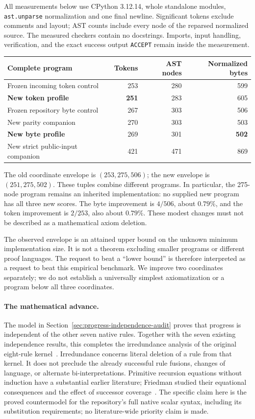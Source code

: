 \documentclass[11pt,letterpaper]{article}
\theoremstyle{definition}
\begin{document}
All measurements below use CPython 3.12.14, whole standalone modules,
\texttt{ast.unparse} normalization and one final newline. Significant tokens
exclude comments and layout; AST counts include every node of the reparsed
normalized source. The measured checkers contain no docstrings. Imports,
input handling, verification, and the exact success output \texttt{ACCEPT}
remain inside the measurement.

\begin{center}\small
\begin{tabular}{lrrr}
\toprule
Complete program & Tokens & AST nodes & Normalized bytes\\
\midrule
Frozen incoming token control & 253 & 280 & 599\\
\textbf{New token profile} & \textbf{251} & 283 & 605\\
Frozen repository byte control & 267 & 303 & 506\\
New parity companion & 270 & 303 & 503\\
\textbf{New byte profile} & 269 & 301 & \textbf{502}\\
New strict public-input companion & 421 & 471 & 869\\
\bottomrule
\end{tabular}
\end{center}

The old coordinate envelope is $(253,275,506)$; the new envelope is
$(251,275,502)$. These tuples combine different programs. In particular,
the 275-node program remains an inherited implementation: no supplied new
program has all three new scores. The byte improvement is $4/506$, about
$0.79\%$, and the token improvement is $2/253$, also about $0.79\%$.
These modest changes must not be described as a mathematical axiom deletion.

The observed envelope is an attained upper bound on the unknown minimum
implementation size. It is not a theorem excluding smaller programs or
different proof languages. The request to beat a ``lower bound'' is therefore
interpreted as a request to beat this empirical benchmark. We improve two
coordinates separately; we do not establish a universally simplest
axiomatization or a program below all three coordinates.

\paragraph{The mathematical advance.}
The model in Section~\ref{sec:progress-independence-audit} proves that
progress is independent of the other seven native rules. Together with the
seven existing independence results, this completes the irredundance
analysis of the original eight-rule kernel~\cite{models}. Irredundance
concerns literal deletion of a rule from that kernel. It does not preclude
the already successful rule fusions, changes of language, or alternate
bi-interpretations. Primitive recursion equations without induction have a
substantial earlier literature; Friedman studied their equational
consequences and the effect of successor coverage~\cite{friedman}. The
specific claim here is the proved countermodel for the repository's full
native scalar syntax, including its substitution requirements; no
literature-wide priority claim is made.
\end{document}
